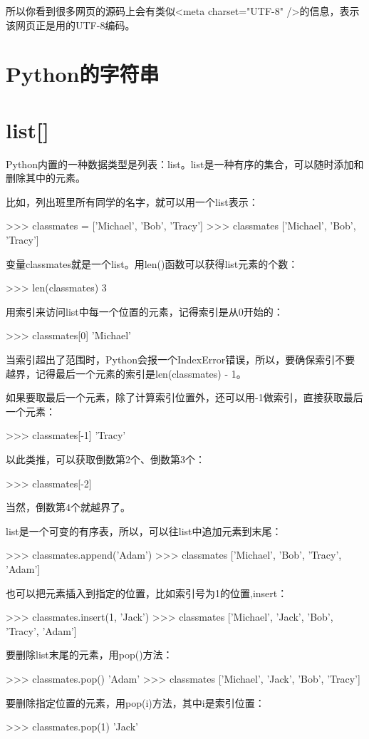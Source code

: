 所以你看到很多网页的源码上会有类似<meta charset="UTF-8" />的信息，表示该网页正是用的UTF-8编码。

\section{Python的字符串}

\section{list[]}
Python内置的一种数据类型是列表：list。list是一种有序的集合，可以随时添加和删除其中的元素。

比如，列出班里所有同学的名字，就可以用一个list表示：

>>> classmates = ['Michael', 'Bob', 'Tracy']
>>> classmates
['Michael', 'Bob', 'Tracy']

变量classmates就是一个list。用len()函数可以获得list元素的个数：

>>> len(classmates)
3

用索引来访问list中每一个位置的元素，记得索引是从0开始的：

>>> classmates[0]
'Michael'

当索引超出了范围时，Python会报一个IndexError错误，所以，要确保索引不要越界，记得最后一个元素的索引是len(classmates) - 1。

如果要取最后一个元素，除了计算索引位置外，还可以用-1做索引，直接获取最后一个元素：

>>> classmates[-1]
'Tracy'

以此类推，可以获取倒数第2个、倒数第3个：

>>> classmates[-2]

当然，倒数第4个就越界了。

list是一个可变的有序表，所以，可以往list中追加元素到末尾：

>>> classmates.append('Adam')
>>> classmates
['Michael', 'Bob', 'Tracy', 'Adam']

也可以把元素插入到指定的位置，比如索引号为1的位置,insert：

>>> classmates.insert(1, 'Jack')
>>> classmates
['Michael', 'Jack', 'Bob', 'Tracy', 'Adam']

要删除list末尾的元素，用pop()方法：

>>> classmates.pop()
'Adam'
>>> classmates
['Michael', 'Jack', 'Bob', 'Tracy']

要删除指定位置的元素，用pop(i)方法，其中i是索引位置：

>>> classmates.pop(1)
'Jack'

